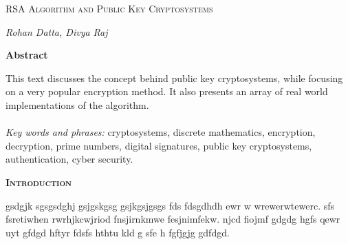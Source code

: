 \documentclass[12 pt]{article}
\begin{document}
\begin{titlepage}
\begin{Huge}
\begin{center}
\textsc{ RSA Algorithm \linebreak
and \linebreak
Public Key Cryptosystems}
\end{center}
\end{Huge}
\begin{center}
\begin{large}
\textsl{ Rohan Datta, Divya Raj}
\end{large}
\end{center}

\bigskip 
\begin{center}
\textbf{Abstract}
\end{center}
This text discusses the concept behind public key cryptosystems, while focusing on a very popular encryption method. It also presents an array of real world implementations of the algorithm.
\\
\\
\textit{Key words and phrases:} cryptosystems, discrete mathematics, encryption, decryption, prime numbers, digital signatures, public key cryptosystems, authentication, cyber security.
\end{titlepage}
\pagebreak
\begin{LARGE}	
\noindent \textbf{\textsc{Introduction}}
\end{LARGE}

\noindent gsdgjk sgsgsdghj gsjgskgsg gsjkgsjgsgs fds fdsgdhdh ewr w wrewerwtewerc. sfs fsretiwhen rwrhjkcwjriod fnsjirnkmwe fesjnimfekw. njcd fiojmf gdgdg hgfs qewr uyt gfdgd hftyr fdsfs hthtu kld g sfe h fgfjgjg gdfdgd.
\end{document}
